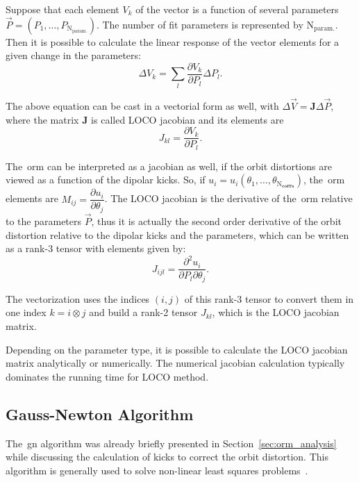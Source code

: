 Suppose that each element $V_k$ of the vector is a function of several parameters $\vec{P} = \left(P_1, \ldots, P_{\mathrm{N}_{\mathrm{param.}}}\right)$. The number of fit parameters is represented by $\mathrm{N}_{\mathrm{param.}}$. Then it is possible to calculate the linear response of the vector elements for a given change in the parameters:
\begin{equation}
\Delta V_{k} = \sum_{l}\dfrac{\partial V_{k}}{\partial P_{l}} \Delta P_{l}.
\label{eq:loco_params}
\end{equation}

The above equation can be cast in a vectorial form as well, with $\Delta \vec{V} = \mathbf{J}\Delta \vec{P}$, where the matrix $\mathbf{J}$ is called LOCO jacobian and its elements are 
\begin{equation}
    J_{kl} = \dfrac{\partial V_{k}}{\partial P_{l}}.
\end{equation}

The~\gls{orm} can be interpreted as a jacobian as well, if the orbit distortions are viewed as a function of the dipolar kicks. So, if $u_i = u_i\left(\theta_1, \ldots, \theta_{\mathrm{N}_{\mathbf{corrs}}}\right)$, the~\gls{orm} elements are $M_{ij} = \dfrac{\partial u_i}{\partial \theta_j}$. The LOCO jacobian is the derivative of the~\gls{orm} relative to the parameters $\vec{P}$, thus it is actually the second order derivative of the orbit distortion relative to the dipolar kicks and the parameters, which can be written as a rank-3 tensor with elements given by:
\begin{equation}
    J_{ijl} = \dfrac{\partial^2 u_i}{\partial P_{l}\partial \theta_j}.
\end{equation}

The vectorization uses the indices $(i, j)$ of this rank-3 tensor to convert them in one index $k = i \otimes j$ and build a rank-2 tensor $J_{kl}$, which is the LOCO jacobian matrix.

Depending on the parameter type, it is possible to calculate the LOCO jacobian matrix analytically or numerically. The numerical jacobian calculation typically dominates the running time for LOCO method.
\subsection{Gauss-Newton Algorithm}
The~\gls{gn} algorithm was already briefly presented in Section~\ref{sec:orm_analysis} while discussing the calculation of kicks to correct the orbit distortion. This algorithm is generally used to solve non-linear least squares problems~\cite{numerical_recipes}. 

